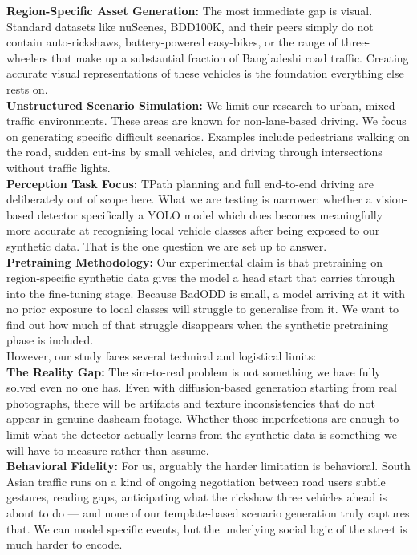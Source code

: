 \textbf{Region-Specific Asset Generation:} The most immediate gap is visual. Standard datasets like nuScenes, BDD100K, and their peers simply do not contain auto-rickshaws, battery-powered easy-bikes, or the range of three-wheelers that make up a substantial fraction of Bangladeshi road traffic. Creating accurate visual representations of these vehicles is the foundation everything else rests on.\\

\textbf{Unstructured Scenario Simulation:} We limit our research to urban, mixed-traffic environments. These areas are known for non-lane-based driving. We focus on generating specific difficult scenarios. Examples include pedestrians walking on the road, sudden cut-ins by small vehicles, and driving through intersections without traffic lights.\\

\textbf{Perception Task Focus:} TPath planning and full end-to-end driving are deliberately out of scope here. What we are testing is narrower: whether a vision-based detector specifically a YOLO model which does becomes meaningfully more accurate at recognising local vehicle classes after being exposed to our synthetic data. That is the one question we are set up to answer.\\

\textbf{Pretraining Methodology:} Our experimental claim is that pretraining on region-specific synthetic data gives the model a head start that carries through into the fine-tuning stage. Because BadODD is small, a model arriving at it with no prior exposure to local classes will struggle to generalise from it. We want to find out how much of that struggle disappears when the synthetic pretraining phase is included.\\

However, our study faces several technical and logistical limits:\\

\textbf{The Reality Gap:} The sim-to-real problem is not something we have fully solved even no one has. Even with diffusion-based generation starting from real photographs, there will be artifacts and texture inconsistencies that do not appear in genuine dashcam footage. Whether those imperfections are enough to limit what the detector actually learns from the synthetic data is something we will have to measure rather than assume.\\

\textbf{Behavioral Fidelity:} For us, arguably the harder limitation is behavioral. South Asian traffic runs on a kind of ongoing negotiation between road users subtle gestures, reading gaps, anticipating what the rickshaw three vehicles ahead is about to do — and none of our template-based scenario generation truly captures that. We can model specific events, but the underlying social logic of the street is much harder to encode.\\

